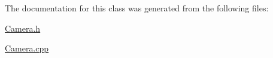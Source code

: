 The documentation for this class was generated from the following files\-:\begin{DoxyCompactItemize}
\item 
\hyperlink{_camera_8h}{Camera.\-h}\item 
\hyperlink{_camera_8cpp}{Camera.\-cpp}\end{DoxyCompactItemize}
